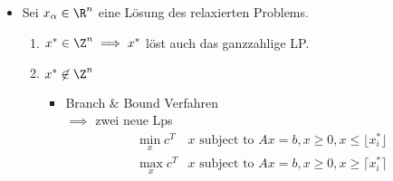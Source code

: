 \begin{beispiel}[Zuschnittsoptimierung]
\begin{enumerate}
\begin{itemize}
			$\to$ zugehörige duale Variable:
			\begin{equation*}
				y = A_{B}^{-T}c_{B}
			\end{equation*}
			$\to $ reduzierte Kosten
			\begin{equation*}
				z_{N} = c_{N} - A_{N}^{T} y
			\end{equation*}
      Hierbei ist $c$ von der Form $c = (\underbrace{1 \, \ldots \, 1}_{x-\text{Teil}} \, \underbrace{0 \, \ldots \, 0}_{s- \text{Teil}})^T$.

      Für $j \in N$, die zu den Schlupfvariablen $s$ gehören, gilt
			\begin{equation*}
				z_{j} = c_{j} - A_{\cdot j}^{T} y = 0 + e_{j}^{T} y = y_{j}
			\end{equation*}
			($y_{j}$ ist bekannt). Für $j \in N$, die zu den Variablen $x$ gehören, gilt
			\begin{equation*}\label{dantzigRegel}
				e_{j} = c_{j} - A_{\cdot j}^{T} y = 1 - \underbrace{H_{\cdot j}^{T}}_{\text{unbekannt}} y \to \min \tag{Dantzig Regel}
			\end{equation*}
      Wir müssen also die \glqq beste\grqq{} Spalte $H_{\cdot j}$ als Lösung von
			\begin{equation*}
				\max_{h} y^{T} h \text{ subject to } 25h_{1} + 30 h_{2} + 35h_{3} \leq 100, h\geq 0 , h \in \Z^3
			\end{equation*}
      bestimmen. Damit erhalten wir ein Rucksackproblem mit Gewichten $=$ Stablängen und Werte $=$ duale Variable $y$. Dieses Rucksackproblem ist ganzzahlig, aber recht klein.
		\item Sei $x_{\alpha} \in \R^n$ eine Lösung des relaxierten Problems.
			\begin{enumerate}[label = \arabic*. Fall:]
				\item $x^* \in \Z^n \implies x^*$ löst auch das ganzzahlige LP.
				\item $x^* \not \in \Z^n$
          \begin{itemize}
            \item Branch $\&$ Bound Verfahren \\
              $\implies$ zwei neue Lps
              \begin{align*}
                \min_{x} c^{T} &x \text{ subject to } Ax = b , x\geq 0 , x\leq \lfloor x_{i}^*\rfloor\\
                \max_{x} c^{T} &x \text{ subject to } Ax = b , x\geq 0 , x\geq \lceil x_{i}^*\rceil
              \end{align*}

\end{itemize}
\end{enumerate}
\end{itemize}
\end{enumerate}
\end{beispiel}
